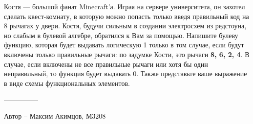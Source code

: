 \question
Костя — большой фанат Minecraft’а. Играя на сервере университета, он захотел сделать квест-комнату, в которую можно попасть только введя правильный код на 8 рычагах у двери. Костя, будучи сильным в создании электросхем из редстоуна, но слабым в булевой алгебре, обратился к Вам за помощью. Напишите булеву функцию, которая будет выдавать логическую 1 только в том случае, если будут включены только правильные рычаги: по задумке Кости, это рычаги \textbf{8, 6, 2, 4}. В случае, если включены не все правильные рычаги или хотя бы один неправильный, то функция будет выдавать 0. Также представьте ваше выражение в виде схемы функциональных элементов.

---------------

Автор -- Максим Акимцов, М3208